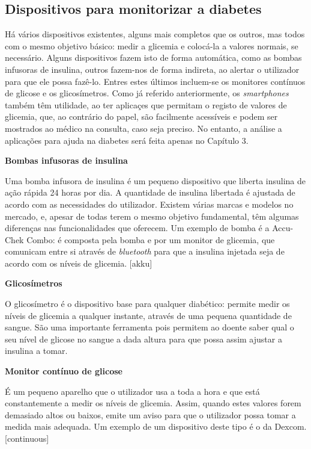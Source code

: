\subsection{Dispositivos para monitorizar a diabetes}

Há vários dispositivos existentes, alguns mais completos que os outros, mas todos com o mesmo objetivo básico: medir a glicemia e colocá-la a valores normais, se necessário. Alguns dispositivos fazem isto de forma automática, como as bombas infusoras de insulina, outros fazem-nos de forma indireta, ao alertar o utilizador para que ele possa fazê-lo. Entres estes últimos incluem-se os monitores contínuos de glicose e os glicosímetros. 
Como já referido anteriormente, os \textit{smartphones} também têm utilidade, ao ter aplicaçes que permitam o registo de valores de glicemia, que, ao contrário do papel, são facilmente acessíveis e podem ser mostrados ao médico na consulta, caso seja preciso. No entanto, a análise a aplicações para ajuda na diabetes será feita apenas no Capítulo 3.

\textbf{Bombas infusoras de insulina}

Uma bomba infusora de insulina é um pequeno dispositivo que liberta insulina de ação rápida 24 horas por dia. A quantidade de insulina libertada é ajustada de acordo com as necessidades do utilizador. Existem várias marcas e modelos no mercado, e, apesar de todas terem o mesmo objetivo fundamental, têm algumas diferenças nas funcionalidades que oferecem. Um exemplo de bomba é a Accu-Chek Combo: é composta pela bomba e por um monitor de glicemia, que comunicam entre si através de \textit{bluetooth} para que a insulina injetada seja de acordo com os níveis de glicemia. [akku]

\textbf{Glicosímetros}

O glicosímetro é o dispositivo base para qualquer diabético: permite medir os níveis de glicemia a qualquer instante, através de uma pequena quantidade de sangue. São uma importante ferramenta pois permitem ao doente saber qual o seu nível de glicose no sangue a dada altura para que possa assim ajustar a insulina a tomar.

\textbf{Monitor contínuo de glicose}

É um pequeno aparelho que o utilizador usa a toda a hora e que está constantemente a medir os níveis de glicemia. Assim, quando estes valores forem demasiado altos ou baixos, emite um aviso para que o utilizador possa tomar a medida mais adequada. Um exemplo de um dispositivo deste tipo é o da Dexcom. [continuous]


